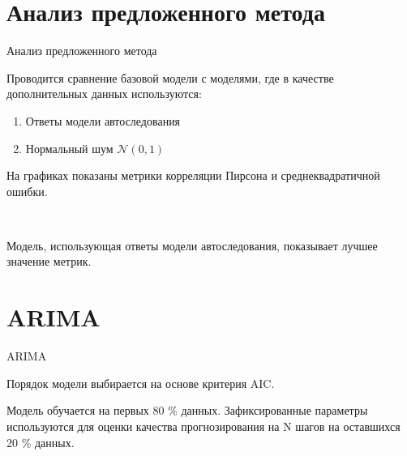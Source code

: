 \documentclass[10pt,pdf,hyperref={unicode}]{beamer}
\begin{document}
\section{Анализ предложенного метода}
\begin{frame}{Анализ предложенного метода}

Проводится сравнение базовой модели с моделями, где в качестве дополнительных данных используются:
\begin{enumerate}[1)]
    \item Ответы модели автоследования
    \item Нормальный шум $ \mathcal{N}(0, 1) $
\end{enumerate}

На графиках показаны метрики корреляции Пирсона и среднеквадратичной ошибки.

\begin{figure}[h!t]\center
{}
\\
\end{figure}

Модель, использующая ответы модели автоследования, показывает лучшее значение метрик.

\end{frame}

\section{ARIMA}
\begin{frame}{ARIMA}

Порядок модели выбирается на основе критерия AIC.

\bigskip

Модель обучается на первых 80 \% данных. Зафиксированные параметры используются для оценки качества прогнозирования на N шагов на оставшихся 20 \% данных.

\end{frame}
\end{document}
